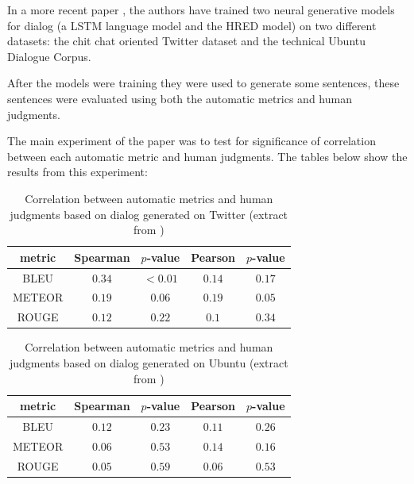 In a more recent paper \cite{LiuLSNCP16}, the authors have trained two neural generative models for dialog (a LSTM language model and the HRED model) on two different datasets: the chit chat oriented Twitter dataset and the technical Ubuntu Dialogue Corpus.

After the models were training they were used to generate some sentences, these sentences were evaluated using both the automatic metrics and human judgments. 

The main experiment of the paper was to test for significance of correlation between each automatic metric and  human judgments. The tables below show the results from this experiment:

\begin{table}[h]
\centering
\label{hownottable}
\begin{tabular}{|c|c|c|c|c|}
\hline
\cellcolor{blue!10} metric & \cellcolor{blue!10} Spearman & \cellcolor{blue!10} $p$-value & \cellcolor{blue!10} Pearson &  \cellcolor{blue!10} $p$-value \\ \hline
BLEU   & $0.34$   & $< 0.01$  & $0.14$  & $0.17$ \\ \hline
METEOR & $0.19$   & $0.06$    & $0.19$  & $0.05$ \\ \hline
ROUGE  & $0.12$   & $0.22$    & $0.1$   & $0.34$ \\ \hline  
\end{tabular}
\caption{Correlation between automatic metrics and human judgments based on dialog generated on Twitter
(extract from \cite{LiuLSNCP16})}
\end{table}


\begin{table}[h]
\centering
\label{hownottable}
\begin{tabular}{|c|c|c|c|c|}
\hline
\cellcolor{blue!10} metric & \cellcolor{blue!10} Spearman & \cellcolor{blue!10} $p$-value & \cellcolor{blue!10} Pearson &  \cellcolor{blue!10} $p$-value \\ \hline
BLEU & $0.12$   & $0.23$    & $0.11$  & $0.26$    \\ \hline
METEOR & $0.06$   & $0.53$    & $0.14$  & $0.16$     \\ \hline
ROUGE & $0.05$   & $0.59$    & $0.06$  & $0.53$    \\ \hline
\end{tabular}
\caption{Correlation between automatic metrics and human judgments based on dialog generated on Ubuntu (extract from \cite{LiuLSNCP16})}
\end{table}

